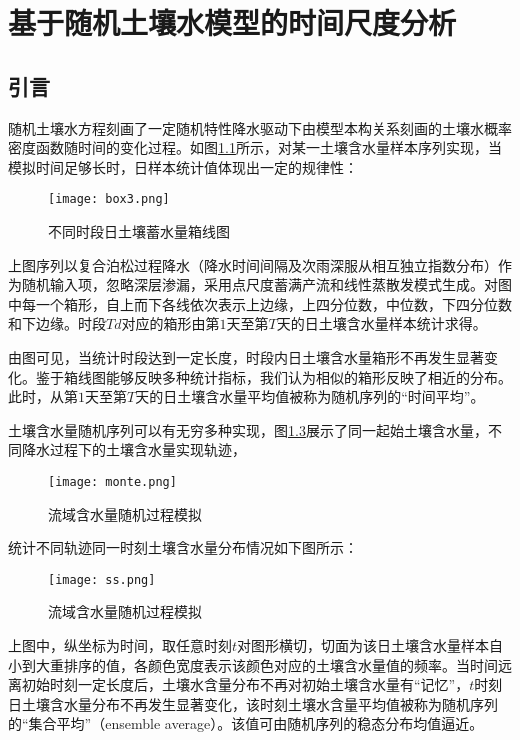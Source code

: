 

\chapter{基于随机土壤水模型的时间尺度分析}
\label{cha:intro}

\section{引言}
随机土壤水方程刻画了一定随机特性降水驱动下由模型本构关系刻画的土壤水概率密度函数随时间的变化过程。如图\ref{box}所示，对某一土壤含水量样本序列实现，当模拟时间足够长时，日样本统计值体现出一定的规律性：
\begin{figure}[H]
\centering
\texttt{[image: box3.png]}
\caption{不同时段日土壤蓄水量箱线图}
\label{box}
\end{figure}
上图序列以复合泊松过程降水（降水时间间隔及次雨深服从相互独立指数分布）作为随机输入项，忽略深层渗漏，采用点尺度蓄满产流和线性蒸散发模式生成。对图中每一个箱形，自上而下各线依次表示上边缘，上四分位数，中位数，下四分位数和下边缘。时段$Td$对应的箱形由第$1$天至第$T$天的日土壤含水量样本统计求得。

由图可见，当统计时段达到一定长度，时段内日土壤含水量箱形不再发生显著变化。鉴于箱线图能够反映多种统计指标，我们认为相似的箱形反映了相近的分布。此时，从第$1$天至第$T$天的日土壤含水量平均值被称为随机序列的``时间平均''。

土壤含水量随机序列可以有无穷多种实现，图\ref{ununity}展示了同一起始土壤含水量，不同降水过程下的土壤含水量实现轨迹，
\begin{figure}[H]
\centering
\texttt{[image: monte.png]}
\caption{流域含水量随机过程模拟}
\label{ununity}
\end{figure}
统计不同轨迹同一时刻土壤含水量分布情况如下图所示：
\begin{figure}[H]
\centering
\texttt{[image: ss.png]}
\caption{流域含水量随机过程模拟}
\label{ununity}
\end{figure}
上图中，纵坐标为时间，取任意时刻$t$对图形横切，切面为该日土壤含水量样本自小到大重排序的值，各颜色宽度表示该颜色对应的土壤含水量值的频率。当时间远离初始时刻一定长度后，土壤水含量分布不再对初始土壤含水量有``记忆''，$t$时刻日土壤含水量分布不再发生显著变化，该时刻土壤水含量平均值被称为随机序列的``集合平均''（ensemble average）。该值可由随机序列的稳态分布均值逼近。
\iffalse
当分布不再随统计时段长发生显著变化时，认为土壤含水量随机过程到达稳态，此时时段内各日的蓄水量$s$可以视为同一稳态分布的样本，根据大数定律，时段累积值以概率$1$趋近于其稳态分布均值乘以时段长度。其它水文变量可根据相应函数关系求得。
\fi


